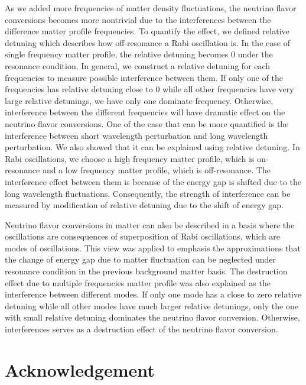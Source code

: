\documentclass[%
reprint,
 amsmath,amssymb,
 prd,
]{revtex4-1}
\begin{document}
As we added more frequencies of matter density fluctuations, the neutrino flavor conversions becomes more nontrivial due to the interferences between the difference matter profile frequencies. To quantify the effect, we defined relative detuning which describes how off-resonance a Rabi oscillation is. In the case of single frequency matter profile, the relative detuning becomes $0$ under the resonance condition. In general, we construct a relative detuning for each frequencies to measure possible interference between them. If only one of the frequencies has relative detuning close to $0$ while all other frequencies have very large relative detunings, we have only one dominate frequency. Otherwise, interference between the different frequencies will have dramatic effect on the neutrino flavor conversions. One of the case that can be more quantified is the interference between short wavelength perturbation and long wavelength perturbation. We also showed that it can be explained using relative detuning. In Rabi oscillations, we choose a high frequency matter profile, which is on-resonance and a low frequency matter profile, which is off-resonance. The interference effect between them is because of the energy gap is shifted due to the long wavelength fluctuations. Consequently, the strength of interference can be measured by modification of relative detuning due to the shift of energy gap.

Neutrino flavor conversions in matter can also be described in a basis where the oscillations are consequences of superposition of Rabi oscillations, which are modes of oscillations. This view was applied to emphasis the approximations that the change of energy gap due to matter fluctuation can be neglected under resonance condition in the previous background matter basis. The destruction effect due to multiple frequencies matter profile was also explained as the interference between different modes. If only one mode has a close to zero relative detuning while all other modes have much larger relative detunings, only the one with small relative detuning dominates the neutrino flavor conversion. Otherwise, interferences serves as a destruction effect of the neutrino flavor conversion.








\section{\label{acknowledgement}Acknowledgement}
\end{document}
